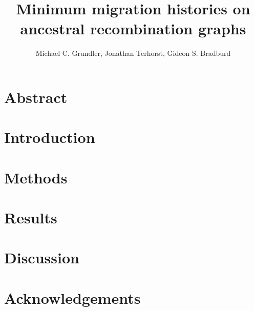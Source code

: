 \documentclass[12pt, letterpaper]{article}
\title{Minimum migration histories on ancestral recombination graphs}
\author{Michael C. Grundler, Jonathan Terhorst, Gideon S. Bradburd}
\begin{document}
\maketitle

\begin{linenumbers}

\section*{Abstract}


\section{Introduction}


\section{Methods}


\section{Results}


\section{Discussion}


\section*{Acknowledgements}






\end{linenumbers}
\end{document}
